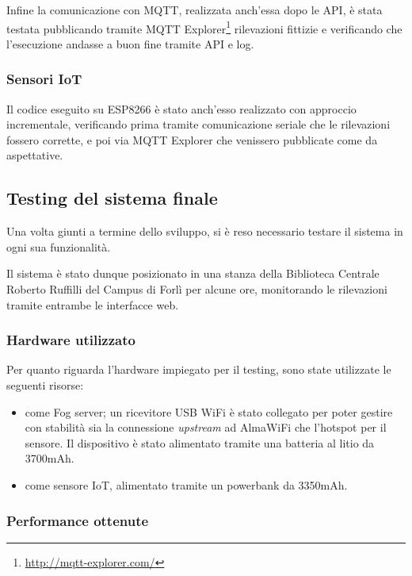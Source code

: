 Infine la comunicazione con MQTT, realizzata anch'essa dopo le API, è stata testata pubblicando tramite MQTT Explorer\footnote{\url{http://mqtt-explorer.com/}} rilevazioni fittizie e verificando che l'esecuzione andasse a buon fine tramite API e log.

\subsubsection{Sensori IoT}

Il codice eseguito su ESP8266 è stato anch'esso realizzato con approccio incrementale, verificando prima tramite comunicazione seriale che le rilevazioni fossero corrette, e poi via MQTT Explorer che venissero pubblicate come da aspettative.

\subsection{Testing del sistema finale}

Una volta giunti a termine dello sviluppo, si è reso necessario testare il sistema in ogni sua funzionalità.

Il sistema è stato dunque posizionato in una stanza della Biblioteca Centrale Roberto Ruffilli del Campus di Forlì per alcune ore, monitorando le rilevazioni tramite entrambe le interfacce web.

\subsubsection{Hardware utilizzato}

Per quanto riguarda l'hardware impiegato per il testing, sono state utilizzate le seguenti risorse:

\begin{itemize}
  \item
     come Fog server;
    un ricevitore USB WiFi è stato collegato per poter gestire con stabilità sia la connessione \emph{upstream} ad AlmaWiFi che l'hotspot per il sensore.
    Il dispositivo è stato alimentato tramite una batteria al litio da 3700mAh.
  \item {} come sensore IoT, alimentato tramite un powerbank da 3350mAh.
\end{itemize}

\subsubsection{Performance ottenute}

